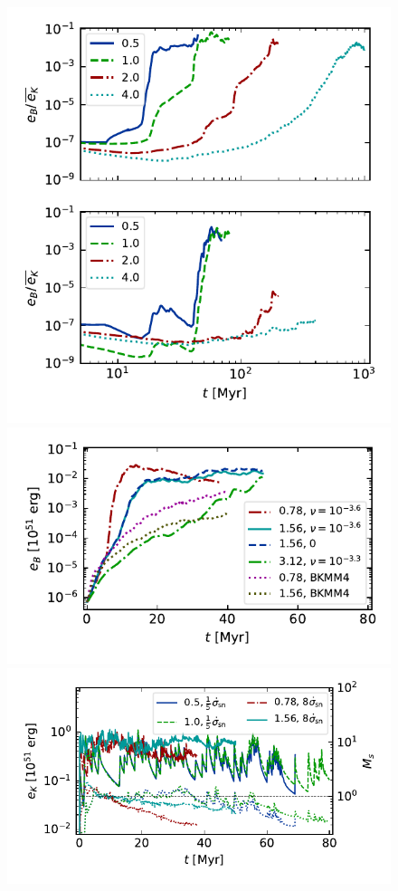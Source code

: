 \documentclass[preprint2]{aastex63}
\begin{document}
\begin{figure}
  \centering
  \includegraphics[trim=0.1cm 0.2cm  0.2cm 0.0cm, clip=true,width=\columnwidth]{figs/eB-res-4eta.pdf}
  \includegraphics[trim=0.1cm 1.0cm -0.8cm 0.2cm, clip=true,width=1.05\columnwidth]{figs/eB-Bals.pdf}
  \includegraphics[trim=0.3cm 0.5cm  0.4cm 0.2cm, clip=true,width=1.05\columnwidth]{figs/eK-Ma.pdf}

\end{figure}
\end{document}
